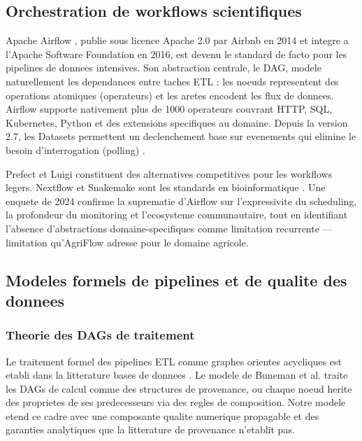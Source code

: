 \documentclass[12pt,a4paper]{article}
\theoremstyle{plain}
\theoremstyle{definition}
\theoremstyle{remark}
\begin{document}
	\subsection{Orchestration de workflows scientifiques}
	
	Apache Airflow \cite{airflow_docs}, publie sous licence Apache 2.0 par
	Airbnb en 2014 et integre a l'Apache Software Foundation en 2016, est
	devenu le standard de facto pour les pipelines de donnees intensives.
	Son abstraction centrale, le DAG, modele naturellement les dependances
	entre taches ETL : les noeuds representent des operations atomiques
	(operateurs) et les aretes encodent les flux de donnees.
	Airflow supporte nativement plus de 1000 operateurs couvrant HTTP,
	SQL, Kubernetes, Python et des extensions specifiques au domaine.
	Depuis la version 2.7, les Datasets permettent un declenchement base
	sur evenements qui elimine le besoin d'interrogation (polling)
	\cite{airflow_docs}.
	
	Prefect et Luigi constituent des alternatives competitives pour les
	workflows legers. Nextflow et Snakemake sont les standards en
	bioinformatique \cite{bioinformatics_workflow}. Une enquete de 2024
	\cite{pipeline_survey_2024} confirme la suprematie d'Airflow sur
	l'expressivite du scheduling, la profondeur du monitoring et l'ecosysteme
	communautaire, tout en identifiant l'absence d'abstractions
	domaine-specifiques comme limitation recurrente --- limitation qu'AgriFlow
	adresse pour le domaine agricole.
	
	\subsection{Modeles formels de pipelines et de qualite des donnees}
	
	\subsubsection{Theorie des DAGs de traitement}
	
	Le traitement formel des pipelines ETL comme graphes orientes acycliques
	est etabli dans la litterature bases de donnees \cite{dag_pipeline_formal}.
	Le modele de Buneman et al. \cite{data_provenance} traite les DAGs
	de calcul comme des structures de provenance, ou chaque noeud herite
	des proprietes de ses predecesseurs via des regles de composition.
	Notre modele etend ce cadre avec une composante qualite numerique
	propagable et des garanties analytiques que la litterature de provenance
	n'etablit pas.
	
\end{document}
